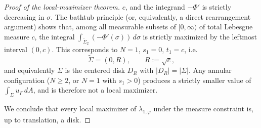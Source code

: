 \begin{proof}[Proof of the local-maximizer theorem]
\(c\), and the integrand \(-\Phi'\) is strictly decreasing in \(\sigma\). The
bathtub principle (or, equivalently, a direct rearrangement argument) shows
that, among all measurable subsets of \([0,\infty)\) of total Lebesgue measure
\(c\), the integral \(\int_{\widetilde\Sigma_2}(-\Phi'(\sigma))\,d\sigma\) is
strictly maximized by the leftmost interval \((0,c)\). This corresponds to
\(N=1\), \(s_1=0\), \(t_1=c\), i.e.
\[
\widetilde \Sigma=(0,R),
\qquad R:=\sqrt c,
\]
and equivalently \(\Sigma\) is the centered disk \(D_R\) with
\(|D_R|=|\Sigma|\). Any annular configuration (\(N\ge 2\), or \(N=1\) with
\(s_1>0\)) produces a strictly smaller value of \(\int_\Sigma u_F\,dA\), and is
therefore not a local maximizer.

We conclude that every local maximizer of \(\lambda_{1,\varphi}\) under the
measure constraint is, up to translation, a disk.
\end{proof}



